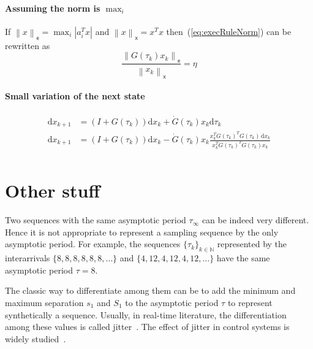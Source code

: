 \documentclass[12pt,draftcls,onecolumn]{IEEEtran} %
\newcommand{\ud}{\mathrm{d}}
\newcommand{\nE}[1]{\left\|#1\right\|_{\mathsf e}}
\newcommand{\nX}[1]{\left\|#1\right\|_{\mathsf x}}
\newcommand{\NN}{\mathbb{N}}
\begin{document}
\paragraph{Assuming the norm is $\max_i$}

If $\nE{x}=\max_i|a_i^Tx|$ and $\nX{x}=x^Tx$
then~(\ref{eq:execRuleNorm}) can be rewritten as
\begin{equation}
  \label{eq:normEisMax}
  \frac{\nE{G(\tau_k)x_k}}{\nX{x_k}} = \eta
\end{equation}

\paragraph{Small variation of the next state}

\begin{align*}
  \ud x_{k+1}&=(I+G(\tau_k))\ud x_k+\dot G(\tau_k)x_k\ud \tau_k \\
  \ud x_{k+1}&=(I+G(\tau_k))\ud x_k
  -\dot G(\tau_k)x_k \frac{x_k^TG(\tau_k)^TG(\tau_k)\,\ud x_k}
  {x_k^TG(\tau_k)^T\dot G(\tau_k)x_k}
\\
\end{align*}


\section{Other stuff}
\label{sec:othe}

Two sequences with the same asymptotic period $\tau_\infty$ can be
indeed very different. Hence it is not appropriate to represent a
sampling sequence by the only asymptotic period. For example, the
sequences $\{\tau_k\}_{k\in\NN}$ represented by the interarrivals
$\{8,8,8,8,8,8,\ldots\}$ and $\{4,12,4,12,4,12,\ldots\}$ have the same
asymptotic period $\tau=8$.

The classic way to differentiate among them can be to add the minimum
and maximum separation $s_1$ and $S_1$ to the asymptotic period $\tau$
to represent synthetically a sequence. Usually, in real-time
literature, the differentiation among these values is called
jitter~\cite{But04}. The effect of jitter in control systems is
widely studied~\cite{Mar01,Cer04}.
\end{document}
